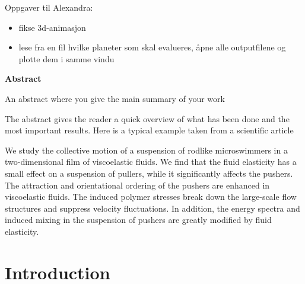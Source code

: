 \documentclass{article}
\begin{document}
Oppgaver til Alexandra:

\begin{itemize}
    \item fikse 3d-animasjon \\
    \item lese fra en fil hvilke planeter som skal evalueres, åpne alle outputfilene og plotte dem i samme vindu \\
\end{itemize}


\vspace{1cm}


\begin{center}

{\Large\textbf{Abstract}} \label{sec:Abstract}

\end{center}

An abstract where you give the main summary of your work


The abstract gives the reader a quick overview of what has been done and the most important results. Here is a typical example taken from a scientific article

We study the collective motion of a suspension of rodlike microswimmers in a two-dimensional film of viscoelastic fluids. We find that the fluid elasticity has a small effect on a suspension of pullers, while it significantly affects the pushers. The attraction and orientational ordering of the pushers are enhanced in viscoelastic fluids. The induced polymer stresses break down the large-scale flow structures and suppress velocity fluctuations. In addition, the energy spectra and induced mixing in the suspension of pushers are greatly modified by fluid elasticity.

\newpage


\vspace{1cm}

\tableofcontents

\vspace{1cm}

\vspace{1cm}

\section{Introduction} \label{sec:Introduction}
\end{document}
